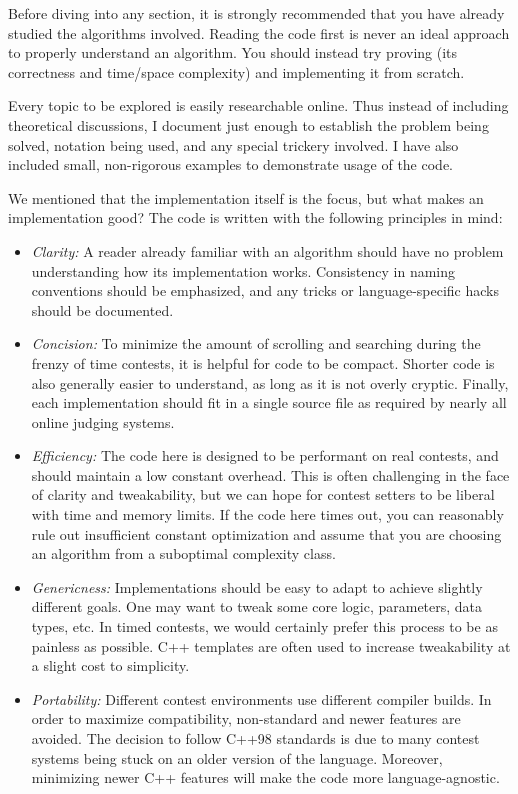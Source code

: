 \documentclass[11pt,letterpaper,twoside]{book}
\begin{document}
Before diving into any section, it is strongly recommended that you have already studied the algorithms involved. Reading the code first is never an ideal approach to properly understand an algorithm. You should instead try proving (its correctness and time/space complexity) and implementing it from scratch.

Every topic to be explored is easily researchable online. Thus instead of including theoretical discussions, I document just enough to establish the problem being solved, notation being used, and any special trickery involved. I have also included small, non-rigorous examples to demonstrate usage of the code.

We mentioned that the implementation itself is the focus, but what makes an implementation good? The code is written with the following principles in mind:
\begin{itemize}
	\item \textit{Clarity:} A reader already familiar with an algorithm should have no problem understanding how its implementation works. Consistency in naming conventions should be emphasized, and any tricks or language-specific hacks should be documented.
	\item \textit{Concision:} To minimize the amount of scrolling and searching during the frenzy of time contests, it is helpful for code to be compact. Shorter code is also generally easier to understand, as long as it is not overly cryptic. Finally, each implementation should fit in a single source file as required by nearly all online judging systems.
	\item \textit{Efficiency:} The code here is designed to be performant on real contests, and should maintain a low constant overhead. This is often challenging in the face of clarity and tweakability, but we can hope for contest setters to be liberal with time and memory limits. If the code here times out, you can reasonably rule out insufficient constant optimization and assume that you are choosing an algorithm from a suboptimal complexity class.
	\item \textit{Genericness:} Implementations should be easy to adapt to achieve slightly different goals. One may want to tweak some core logic, parameters, data types, etc. In timed contests, we would certainly prefer this process to be as painless as possible. C++ templates are often used to increase tweakability at a slight cost to simplicity.
	\item \textit{Portability:} Different contest environments use different compiler builds. In order to maximize compatibility, non-standard and newer features are avoided. The decision to follow C++98 standards is due to many contest systems being stuck on an older version of the language. Moreover, minimizing newer C++ features will make the code more language-agnostic.
\end{itemize}
\end{document}
